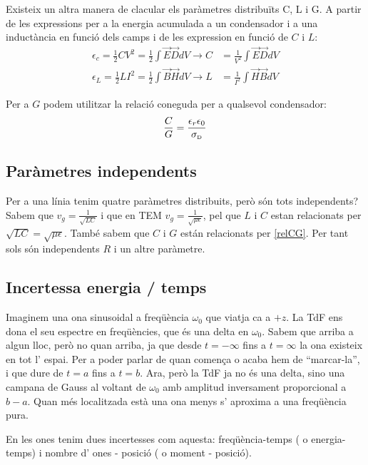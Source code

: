 Existeix un altra manera de clacular els paràmetres distribuïts C, L i G. A partir de les expressions per a la energia acumulada a un condensador i a una inductància en funció dels camps i de les expression en funció de $C$ i $L$:
\begin{subequations}
  \begin{align}
    \epsilon _c = \frac{1}{2} C V ^2 = \frac{1}{2} \int \vec E \vec D dV \to C &= \frac{1}{V^2} \int \vec E \vec D dV \\
    \epsilon _L = \frac{1}{2} L I ^2 = \frac{1}{2} \int \vec B \vec H dV \to L &= \frac{1}{I^2} \int \vec H \vec B dV
  \end{align}
\end{subequations}

Per a $G$ podem utilitzar la relació coneguda per a qualsevol condensador:
\begin{equation}
  \label{relCG}
  \frac{C}{G} = \frac{ \epsilon _ r \epsilon _0}{\sigma _{\text{\tiny D}}}
\end{equation}

\subsection{Paràmetres independents}

Per a una línia tenim quatre paràmetres distribuits, però són tots independents? Sabem que $v_g = \frac{1}{\sqrt{LC}}$ i que en TEM $v_g = \frac{1}{\sqrt{\mu\epsilon}}$, pel que $L$ i $C$ estan relacionats per $\sqrt{LC} = \sqrt{\mu \epsilon}$. També sabem que $C$ i $G$ están relacionats per \cref{relCG}. Per tant sols són independents $R$ i un altre paràmetre.

\subsection{Incertessa energia / temps}

Imaginem una ona sinusoidal a freqüència $\omega_0$ que viatja ca a $+z$. La TdF ens dona el seu espectre en freqüències, que és una delta en $\omega _ 0$. Sabem que arriba a algun lloc, però no quan arriba, ja que desde $t=-\infty$ fins a $t = \infty$ la ona existeix en tot l' espai. Per a poder parlar de quan comença o acaba hem de ``marcar-la'', i que dure de $t=a$ fins a $t=b$. Ara, però la TdF ja no és una delta, sino una campana de Gauss al voltant de $\omega _0$ amb amplitud inversament proporcional a $b - a$. Quan més localitzada està una ona menys s' aproxima a una freqüència pura.

 En les ones tenim dues incertesses com aquesta: freqüència-temps ( o energia-temps) i nombre d' ones - posició ( o moment - posició).